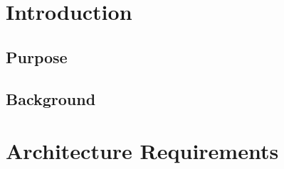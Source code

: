 \documentclass[12pt]{article}
\begin{document}
\newpage
\tableofcontents
\newpage

\section{Introduction}

\subsection{Purpose}

\subsection{Background}

\section{Architecture Requirements}

\end{document}
